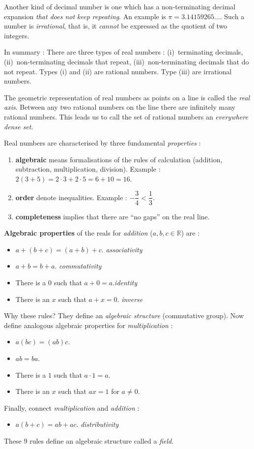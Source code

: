 \documentclass[titlepage,a4paper,12pt]{report}
\begin{document}
\begin{enumerate}
Another kind of decimal number is one which has a non-terminating decimal expansion \textit{that does not keep repeating}. An example is $\pi=3.14159265\dots $. Such a number is \textit{irrational}, that is, it \textit{cannot} be expressed as the quotient of two integers. 

In summary : There are three types of real numbers : (i)\, terminating decimals, \quad (ii)\, non-terminating decimals that repeat, \quad (iii)\, non-terminating decimals that do not repeat. Types (i) and (ii) are rational numbers. Type (iii) are irrational numbers.
 
The geometric representation of real numbers as points on a line is called the \textit{real axis}. Between any two rational numbers on the line there are infinitely many rational numbers. This leads us to call the set of rational numbers an \textit{everywhere dense set}.

Real numbers are characterised by three fundamental \textit{properties} :\\
\begin{enumerate}
\item \textbf{algebraic} means formalisations of the rules of calculation (addition, subtraction, multiplication, division). Example : $2(3+5)=2\cdot3 +2\cdot 5=6+10=16 $.
\item \textbf{order} denote inequalities. Example : $-\dfrac{3}{4}<\dfrac{1}{3}$.
\item \textbf{completeness} implies that there are ``no gaps'' on the real line.
\end{enumerate}
\textbf{Algebraic properties} of the reals for \textit{addition} ($a,b,c\in \mathbb{R}$) are :
\begin{itemize}
\item[(A1)] $a+(b+c)=(a+b)+c$. \textit{associativity}
\item[(A2)] $a+b=b+a$. \textit{commutativity}
\item[(A3)] There is a $0$ such that $a+0=a$.\quad  \textit{identity}
\item[(A4)] There is an $x$ such that $a+x=0$. \quad \textit{inverse}
\end{itemize}
Why these rules? They define an \textit{algebraic structure} (commutative group). Now define analogous algebraic properties for \textit{multiplication} :
\begin{itemize}
\item[(M1)] $a(bc)=(ab)c$.
\item[(M2)] $ab=ba$.
\item[(M3)] There is a $1$ such that $a\cdot 1=a$.
\item[(M4)] There is an $x$ such that $ax=1$ for $a\neq 0$.
\end{itemize}
Finally, connect \textit{multiplication} and \textit{addition} :
\begin{itemize}
\item[(D)] $a(b+c)=ab+ac$. \textit{distributivity}
\end{itemize}
These $9$ rules define an algebraic structure called a \textit{field}.


\end{enumerate}
\end{document}
